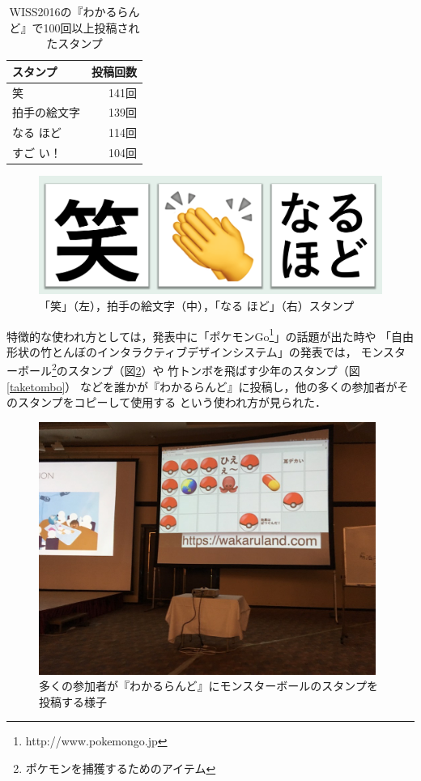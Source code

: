 \begin{table}[H]
  \begin{center}
    \caption{WISS2016の『わかるらんど』で100回以上投稿されたスタンプ}
    \label{tb:wiss2016stamp}
    \begin{tabular}{|l|r|} \hline
      スタンプ     & 投稿回数 \\ \hline \hline
      笑           & 141回 \\ \hline
      拍手の絵文字 & 139回 \\ \hline
      なる ほど    & 114回 \\ \hline
      すご い！    & 104回 \\ \hline
    \end{tabular}
  \end{center}
\end{table}

\begin{figure}[H]
\centering
\includegraphics[width=12cm]{images/wiss_top3.png}
\caption{「笑」（左），拍手の絵文字（中），「なる ほど」（右）スタンプ}
\label{wiss_top3}
\end{figure}

特徴的な使われ方としては，発表中に「ポケモンGo\footnote{http://www.pokemongo.jp}」の話題が出た時や
「自由形状の竹とんぼのインタラクティブデザインシステム」の発表では，
モンスターボール\footnote{ポケモンを捕獲するためのアイテム}のスタンプ（図\ref{pokemon}）や
竹トンボを飛ばす少年のスタンプ（図\ref{taketombo}）
などを誰かが『わかるらんど』に投稿し，他の多くの参加者がそのスタンプをコピーして使用する
という使われ方が見られた．

\begin{figure}[H]
\centering
\includegraphics[width=11cm]{images/pokemon.png}
\caption{多くの参加者が『わかるらんど』にモンスターボールのスタンプを投稿する様子}
\label{pokemon}
\end{figure}

